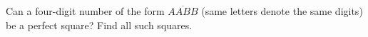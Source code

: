 Can a four-digit number of the form $\overline{AABB}$ (same letters denote the same digits) be a perfect square? Find all such squares.
